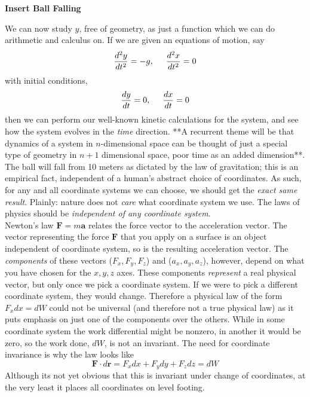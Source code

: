 	\textbf{Insert Ball Falling}
	
	We can now study $y$, free of geometry, as just a function which we can do arithmetic and calculus on. If we are given an equations of motion, say 
	\begin{equation*}
		\frac{d^2y}{dt^2} = -g, \hspace{5mm} \frac{d^2x}{dt^2} = 0
	\end{equation*} 
	with initial conditions,
	\begin{equation*}
		\frac{dy}{dt}=0, \hspace{5mm} \frac{dx}{dt}=0
	\end{equation*}
	 then we can perform our well-known kinetic calculations for the system, and see how the system evolves in the \emph{time} direction. **A recurrent theme will be that dynamics of a system in $n$-dimensional space can be thought of just a special type of geometry in $n+1$ dimensional space, poor time as an added dimension**.\\ 
	
	The ball will fall from 10 meters as dictated by the law of gravitation; this is an empirical fact, independent of a human's abstract choice of coordinates. As such, for any and all coordinate systems we can choose, we should get the \emph{exact same result}. Plainly: nature does not \emph{care} what coordinate system we use.  The laws of physics should be \emph{independent of any coordinate system}.\\
	
	Newton's law $\mathbf F = m \mathbf a$ relates the force vector to the acceleration vector. The vector representing the force $\mathbf F$ that you apply on a surface is an object independent of coordinate system, so is the resulting acceleration vector. The \emph{components} of these vectors ($F_x, F_y, F_z$) and ($a_x, a_y, a_z$), however, depend on what you have chosen for the $x,y,z$ axes. These components \emph{represent} a real physical vector, but only once we pick a coordinate system. If we were to pick a different coordinate system, they would change. Therefore a physical law of the form $F_x dx = dW$ could not be universal (and therefore not a true physical law) as it puts emphasis on just one of the components over the others. While in some coordinate system the work differential might be nonzero, in another it would be zero, so the work done, $dW$, is not an invariant. The need for coordinate invariance is why the law looks like 
	\begin{equation*}
		\mathbf F \cdot  d \mathbf r = F_x dx + F_y dy + F_z dz = d W
	\end{equation*}
	 Although its not yet obvious that this is invariant under change of coordinates, at the very least it places all coordinates on level footing.
	
